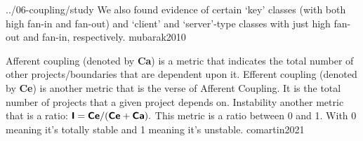 \documentclass{article}
\begin{document}


\lnQuote
  {../06-coupling/study}
  {We also found evidence of certain `key' classes (with both high fan-in and fan-out) and `client' and `server'-type classes with just high fan-out and fan-in, respectively.}
  {mubarak2010}


  {Afferent coupling (denoted by \textbf{\textsf{Ca}}) is a metric that indicates the total number of other projects/boundaries that are dependent upon it. Efferent coupling (denoted by \textbf{\textsf{Ce}}) is another metric that is the verse of Afferent Coupling. It is the total number of projects that a given project depends on. Instability another metric that is a ratio: $\textbf{\textsf{I}} = \textbf{\textsf{Ce}} / (\textbf{\textsf{Ce}} + \textbf{\textsf{Ca}}).$ This metric is a ratio between 0 and 1. With 0 meaning it's totally stable and 1 meaning it's unstable.}
  {comartin2021}

\end{document}
